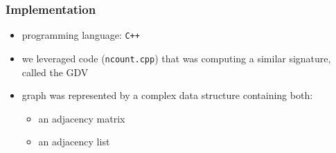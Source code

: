 \documentclass[11pt,xcolor=table]{beamer}
\newcommand{\hilight}[1]{\colorbox{yellow}{#1}}
\begin{document}
\begin{frame}
  \frametitle{Implementation}
  
  \begin{itemize}
   \item programming language: \lstinline|C++| \vfill
   \item we leveraged code (\lstinline|ncount.cpp|) that was computing a similar signature, called the GDV \vfill
   \item graph was represented by a complex data structure containing both: \vfill
   \begin{itemize}
    \item an adjacency matrix \vfill
    \item an adjacency list \vfill
   \end{itemize}
  \end{itemize}

  
\end{frame}
\end{document}
